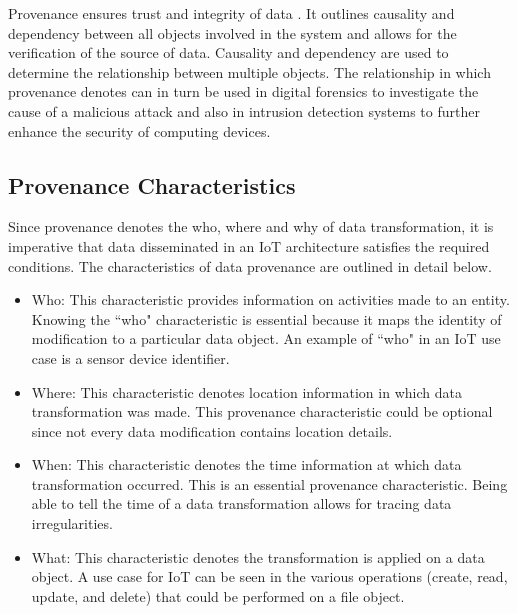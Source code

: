 \par Provenance ensures trust and integrity of data \cite{Bertino2015}. It outlines causality and dependency between all objects involved in the system and allows for the verification of the source of data. Causality and dependency are used to determine the relationship between multiple objects. The relationship in which provenance denotes can in turn be used in digital forensics \cite{zawoadfecloud} to investigate the cause of a malicious attack and also in intrusion detection systems to further enhance the security of computing devices. 
 



%
%



\subsection{Provenance Characteristics}

Since provenance denotes the who, where and why of data transformation, it is imperative that data disseminated in an IoT architecture satisfies the required conditions. The characteristics of data provenance are outlined in detail below.


\begin{itemize}

\item Who: This characteristic provides information on activities made to an entity. Knowing the ``who" characteristic is essential because it maps the identity of modification to a particular data object. An example of ``who" in an IoT use case is a sensor device identifier.

\item Where: This characteristic denotes location information in which data transformation was made. This provenance characteristic could be optional since not every data modification contains location details.

\item When: This characteristic denotes the time information at which data transformation occurred. This is an essential provenance characteristic. Being able to tell the time of a data transformation allows for tracing data irregularities.

\item What: This characteristic denotes the transformation is applied on a data object. A use case for IoT can be seen in the various operations (create, read, update, and delete) that could be performed on a file object.

\end{itemize}



